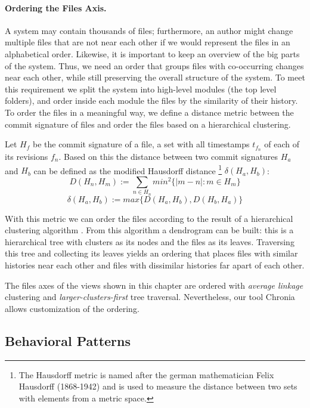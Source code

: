 \paragraph{Ordering the Files Axis.}
A system may contain thousands of files; furthermore, an author might change multiple files that are not near each other if we would represent the files in an alphabetical order. Likewise, it is important to keep an overview of the big parts of the system. Thus, we need an order that groups files with co-occurring changes near each other, while still preserving the overall structure of the system. To meet this requirement we split the system into high-level modules (\eg the top level folders), and order inside each module the files by the similarity of their history. To order the files in a meaningful way, we define a distance metric between the commit signature of files and order the files based on a hierarchical clustering.

Let $H_f$ be the commit signature of a file, a set with all timestamps $t_{f_n}$ of each of its revisions $f_n$. Based on this the distance between two commit signatures $H_a$ and $H_b$ can be defined as the modified Hausdorff distance \footnote{The Hausdorff metric is named after the german mathematician Felix Hausdorff (1868-1942) and is used to measure the distance between two sets with elements from a metric space.} $\delta(H_a,H_b)$:
\[
D(H_n,H_m) := \sum_{n \in H_n} min^2 \{ \vert m -n \vert : m \in H_m \}
\]
\[
\delta(H_a,H_b) := max \{ D(H_a,H_b), D(H_b,H_a) \}
\]

With this metric we can order the files according to the result of a hierarchical clustering algorithm \cite{Jain99a}. From this algorithm a dendrogram can be built: this is a hierarchical tree with clusters as its nodes and the files as its leaves. Traversing this tree and collecting its leaves yields an ordering that places files with similar histories near each other and files with dissimilar histories far apart of each other.

The files axes of the \omap views shown in this chapter are ordered with \textit{average linkage} clustering and \textit{larger-clusters-first} tree traversal. Nevertheless, our tool Chronia allows customization of the ordering.

\subsection{Behavioral Patterns}

